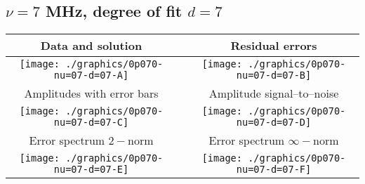 

% 

\clearpage{}
\break{}

\subsection{$\nu = 7$ MHz, degree of fit $d = 7$}

\begin{table}[h]
    \begin{center}
        \begin{tabular}{ccc}
            Data and solution & \quad & Residual errors \\\hline
            \texttt{[image: ./graphics/0p070-nu=07-d=07-A]} &&
            \texttt{[image: ./graphics/0p070-nu=07-d=07-B]} \\[15pt]
            Amplitudes with error bars && Amplitude signal--to--noise \\\hline
            \texttt{[image: ./graphics/0p070-nu=07-d=07-C]} &&
            \texttt{[image: ./graphics/0p070-nu=07-d=07-D]} \\[15pt]
            Error spectrum $2-$norm && Error spectrum $\infty-$norm \\\hline
            \texttt{[image: ./graphics/0p070-nu=07-d=07-E]} &&
            \texttt{[image: ./graphics/0p070-nu=07-d=07-F]} \\[15pt]
        \end{tabular}
    \end{center}
\label{fig:elev=70, nu=7}
\end{table}



\endinput

